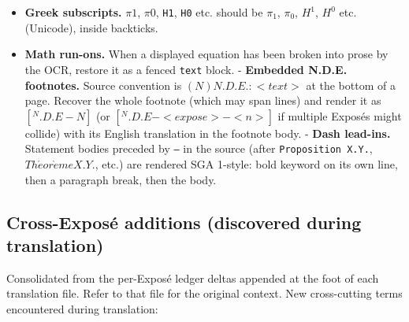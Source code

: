 \documentclass[
]{article}
\providecommand{\tightlist}{%
  \setlength{\itemsep}{0pt}\setlength{\parskip}{0pt}}
\begin{document}
\begin{itemize}
  \begin{itemize}
  \tightlist
  \item
    \(Et(X)\) should be \(\hat{E}t(X)\) (the étale site / category of
    étale objects).
  \item
    \texttt{etale} should be \texttt{étale}.
  \item
    \texttt{Tohoku} should be \emph{Tôhoku}.
  \end{itemize}
\item
  \textbf{Greek subscripts.} \(\pi 1\), \(\pi 0\), \texttt{H1},
  \texttt{H0} etc. should be \(\pi_{1}\), \(\pi_{0}\), \(H^{1}\),
  \(H^{0}\) etc. (Unicode), inside backticks.
\item
  \textbf{Math run-ons.} When a displayed equation has been broken into
  prose by the OCR, restore it as a fenced
  \texttt{\textasciigrave{}\textasciigrave{}\textasciigrave{}text}
  block. - \textbf{Embedded N.D.E. footnotes.} Source convention is
  \((N) N.D.E. : <text>\) at the bottom of a page. Recover the whole
  footnote (which may span lines) and render it as \([{}^{N}.D.E-N]\)
  (or \([{}^{N}.D.E-<expose>-<n>]\) if multiple Exposés might collide)
  with its English translation in the footnote body. - \textbf{Dash
  lead-ins.} Statement bodies preceded by \texttt{—} in the source
  (after \texttt{Proposition\ X.Y.}, \(Th\acute{e}or\grave{e}me X.Y.\),
  etc.) are rendered SGA 1-style: bold keyword on its own line, then a
  paragraph break, then the body.
\end{itemize}

\subsection{Cross-Exposé additions (discovered during
translation)}\label{cross-exposuxe9-additions-discovered-during-translation}

Consolidated from the per-Exposé ledger deltas appended at the foot of
each translation file. Refer to that file for the original context. New
cross-cutting terms encountered during translation:
\end{document}

